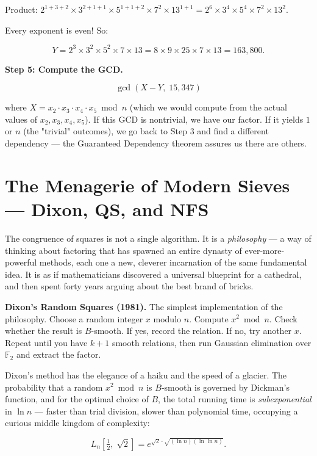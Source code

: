 \documentclass[11pt,twoside,openright]{book}
\theoremstyle{definition}
\theoremstyle{remark}
\begin{document}
Product: $2^{1+3+2} \times 3^{2+1+1} \times 5^{1+1+2} \times 7^{2} \times 13^{1+1} = 2^6 \times 3^4 \times 5^4 \times 7^2 \times 13^2$.

Every exponent is even! So:

\[Y = 2^3 \times 3^2 \times 5^2 \times 7 \times 13 = 8 \times 9 \times 25 \times 7 \times 13 = 163{,}800.\]

\textbf{Step 5: Compute the GCD.}

\[\gcd(X - Y, \; 15{,}347)\]

where $X = x_2 \cdot x_3 \cdot x_4 \cdot x_5 \bmod n$ (which we would compute from the actual values of $x_2, x_3, x_4, x_5$). If this GCD is nontrivial, we have our factor. If it yields $1$ or $n$ (the "trivial" outcomes), we go back to Step 3 and find a different dependency --- the Guaranteed Dependency theorem assures us there are others.




\section{The Menagerie of Modern Sieves --- Dixon, QS, and NFS}

The congruence of squares is not a single algorithm. It is a \textit{philosophy} --- a way of thinking about factoring that has spawned an entire dynasty of ever-more-powerful methods, each one a new, cleverer incarnation of the same fundamental idea. It is as if mathematicians discovered a universal blueprint for a cathedral, and then spent forty years arguing about the best brand of bricks.

\textbf{Dixon's Random Squares (1981).} The simplest implementation of the philosophy. Choose a random integer $x$ modulo $n$. Compute $x^2 \bmod n$. Check whether the result is $B$-smooth. If yes, record the relation. If no, try another $x$. Repeat until you have $k + 1$ smooth relations, then run Gaussian elimination over $\mathbb{F}_2$ and extract the factor.

Dixon's method has the elegance of a haiku and the speed of a glacier. The probability that a random $x^2 \bmod n$ is $B$-smooth is governed by Dickman's function, and for the optimal choice of $B$, the total running time is \textit{subexponential} in $\ln n$ --- faster than trial division, slower than polynomial time, occupying a curious middle kingdom of complexity:

\[L_n\!\left[\tfrac{1}{2}, \; \sqrt{2}\right] = e^{\sqrt{2} \cdot \sqrt{(\ln n)(\ln \ln n)}}.\]
\end{document}
